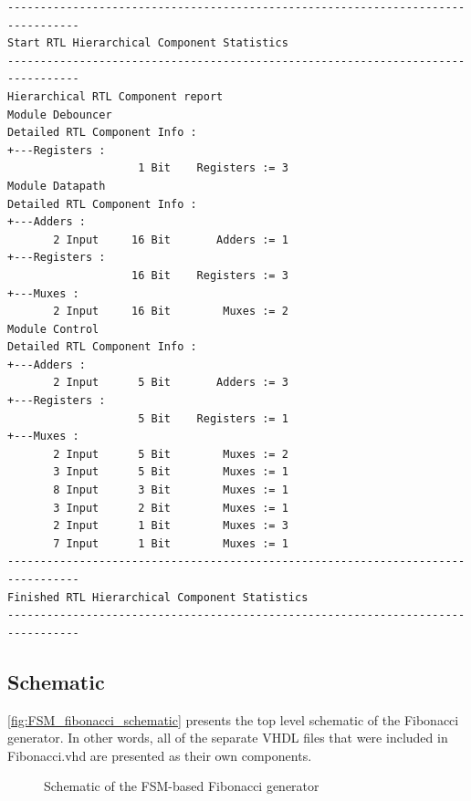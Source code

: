 \documentclass[10pt]{article}
\begin{document}
\begin{verbatim}
---------------------------------------------------------------------------------
Start RTL Hierarchical Component Statistics 
---------------------------------------------------------------------------------
Hierarchical RTL Component report 
Module Debouncer 
Detailed RTL Component Info : 
+---Registers : 
	                1 Bit    Registers := 3     
Module Datapath 
Detailed RTL Component Info : 
+---Adders : 
	   2 Input     16 Bit       Adders := 1     
+---Registers : 
	               16 Bit    Registers := 3     
+---Muxes : 
	   2 Input     16 Bit        Muxes := 2     
Module Control 
Detailed RTL Component Info : 
+---Adders : 
	   2 Input      5 Bit       Adders := 3     
+---Registers : 
	                5 Bit    Registers := 1     
+---Muxes : 
	   2 Input      5 Bit        Muxes := 2     
	   3 Input      5 Bit        Muxes := 1     
	   8 Input      3 Bit        Muxes := 1     
	   3 Input      2 Bit        Muxes := 1     
	   2 Input      1 Bit        Muxes := 3     
	   7 Input      1 Bit        Muxes := 1     
---------------------------------------------------------------------------------
Finished RTL Hierarchical Component Statistics
---------------------------------------------------------------------------------
\end{verbatim}
\newpage

\subsection{Schematic}
 \autoref{fig:FSM_fibonacci_schematic} presents the top level schematic of the Fibonacci generator. In other words, all of the separate VHDL files that were included in Fibonacci.vhd are presented as their own components.
\begin{figure}[ht]
    \centering
    \caption{Schematic of the FSM-based Fibonacci generator }
    \label{fig:FSM_fibonacci_schematic}
\end{figure}
\end{document}
